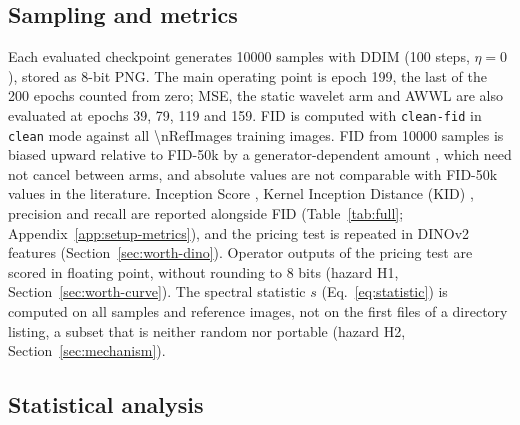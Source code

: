 \subsection{Sampling and metrics}
\label{sec:setup-metrics}

Each evaluated checkpoint generates \num{10000} samples with DDIM
\citep{song2021denoising} (100 steps, $\eta = 0$), stored as 8-bit PNG. The
main operating point is epoch 199, the last of the 200 epochs counted from
zero; MSE, the static wavelet arm and AWWL are also evaluated at epochs 39,
79, 119 and 159. FID \citep{heusel2017gans} is computed with \texttt{clean-fid}
\citep{parmar2022aliased} in \texttt{clean} mode against all
\num{\nRefImages} training images. FID from \num{10000} samples is biased
upward relative to FID-50k by a generator-dependent amount
\citep{chong2020effectively}, which need not cancel between arms, and
absolute values are not comparable with FID-50k values in the literature.
Inception Score \citep{salimans2016improved}, Kernel Inception Distance
(KID) \citep{binkowski2018demystifying}, precision and recall
\citep{kynkaanniemi2019improved} are reported alongside FID
(Table~\ref{tab:full}; Appendix~\ref{app:setup-metrics}), and the pricing
test is repeated in DINOv2 features (Section~\ref{sec:worth-dino}). Operator
outputs of the pricing test are scored in floating point, without rounding to
8 bits (hazard H1, Section~\ref{sec:worth-curve}). The
spectral statistic $s$ (Eq.~\eqref{eq:statistic}) is computed on all samples
and reference images, not on the first files of a directory listing, a
subset that is neither random nor portable (hazard H2,
Section~\ref{sec:mechanism}).

\subsection{Statistical analysis}
\label{sec:setup-stats}

